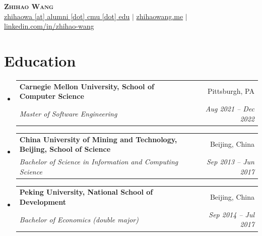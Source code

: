 \documentclass[letterpaper,10pt]{extarticle}
\makeatletter
\newcommand{\resumeSubheading}[4]{
  \vspace{-1pt}\item
    \begin{tabular*}{0.97\textwidth}[t]{l@{\extracolsep{\fill}}r}
      \textbf{#1} & \small #2 \\
      \textit{\small#3} & \textit{\small #4} \\
    \end{tabular*}\vspace{-5pt}
}
\newcommand{\resumeSubHeadingListStart}{\begin{itemize}[leftmargin=0.1in, label={}, topsep=0pt, itemsep=4pt, parsep=0pt]}
\newcommand{\resumeSubHeadingListEnd}{\end{itemize}\vspace{-2pt}}
\newcommand{\resumeItemListStart}{\begin{itemize}[leftmargin=0.18in, label=\textbullet, topsep=6pt, itemsep=2pt, parsep=0pt]}
\newcommand{\resumeItemListEnd}{\end{itemize}\vspace{-2pt}}
\makeatother
\begin{document}
\begin{center}
  \textbf{\LARGE \scshape Zhihao Wang} \\ \vspace{2pt}
  \small \href{mailto:zhihaowa@alumni.cmu.edu}{zhihaowa [at] alumni [dot] cmu [dot] edu} $|$
  \href{https://zhihaowang.me}{zhihaowang.me} $|$
  \href{https://linkedin.com/in/zhihao-wang}{linkedin.com/in/zhihao-wang}
\end{center}
\vspace{-14pt}
\section{Education}
\resumeSubHeadingListStart
  \resumeSubheading
    {Carnegie Mellon University, School of Computer Science}{Pittsburgh, PA}
    {Master of Software Engineering}{Aug 2021 -- Dec 2022}
  \resumeSubheading
    {China University of Mining and Technology, Beijing, School of Science}{Beijing, China}
    {Bachelor of Science in Information and Computing Science}{Sep 2013 -- Jun 2017}
  \resumeSubheading
    {Peking University, National School of Development}{Beijing, China}
    {Bachelor of Economics (double major)}{Sep 2014 -- Jul 2017}
\resumeSubHeadingListEnd
\end{document}
